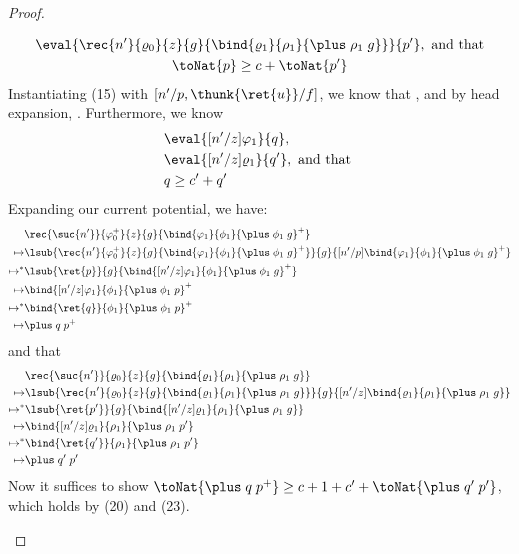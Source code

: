 \begin{proof}
\begin{itemize}
\begin{gather}
    \eval{\rec{n'}{\varrho_0}{z}{g}{\bind{\varrho_1}{\rho_1}{\plus\;\rho_1\;g}}}{p'}, \text{ and that}\\
    \toNat{p} \ge c + \toNat{p'}
    \end{gather}
    Instantiating (15) with $[n'/p, \thunk{\ret{u}}/f]$, we know that
    ,
    and by head expansion, . Furthermore, we know
    \begin{align}
        &\eval{[n'/z]\varphi_1}{q},\\
        &\eval{[n'/z]\varrho_1}{q'}, \text{ and that }\\
        &q \ge c' + q'
    \end{align}
    Expanding our current potential, we have:
    \begin{align*}
        &\rec{\suc{n'}}{\varphi_0^+}{z}{g}{\bind{\varphi_1}{\phi_1}{\plus\;\phi_1\;g}^+}\\
        \mapsto& \lsub{\rec{n'}{\varphi_0^+}{z}{g}{\bind{\varphi_1}{\phi_1}{\plus\;\phi_1\;g}^+}}{g}{[n'/p]\bind{\varphi_1}{\phi_1}{\plus\;\phi_1\;g}^+}\\
        \mapsto^*& \lsub{\ret{p}}{g}{\bind{[n'/z]\varphi_1}{\phi_1}{\plus\;\phi_1\;g}^+}\\
        \mapsto& \bind{[n'/z]\varphi_1}{\phi_1}{\plus\;\phi_1\;p}^+\\
        \mapsto^*& \bind{\ret{q}}{\phi_1}{\plus\;\phi_1\;p}^+\\
        \mapsto& \plus\; q \; p ^+
    \end{align*} and that 
    \begin{align*}
        &\rec{\suc{n'}}{\varrho_0}{z}{g}{\bind{\varrho_1}{\rho_1}{\plus\;\rho_1\; g}}\\
        \mapsto& \lsub{\rec{n'}{\varrho_0}{z}{g}{\bind{\varrho_1}{\rho_1}{\plus\;\rho_1\; g}}}{g}{[n'/z]\bind{\varrho_1}{\rho_1}{\plus\;\rho_1\; g}}\\
        \mapsto^*& \lsub{\ret{p'}}{g}{\bind{[n'/z]\varrho_1}{\rho_1}{\plus\;\rho_1\; g}}\\
        \mapsto& \bind{[n'/z]\varrho_1}{\rho_1}{\plus\;\rho_1\; p'}\\
        \mapsto^*& \bind{\ret{q'}}{\rho_1}{\plus\;\rho_1\; p'}\\
        \mapsto& \plus\;q'\; p'
    \end{align*}
    Now it suffices to show $\toNat{\plus\; q \; p ^+} \ge c + 1 + c' + \toNat{\plus\;q'\; p'}$,
    which holds by (20) and (23).
\end{itemize}
\end{proof}


